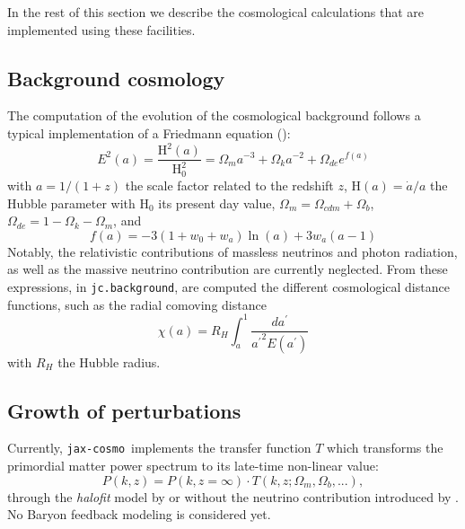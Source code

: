 \documentclass[twocolumn,twocolappendix,nofootinbib,iop]{openjournal}
\newcommand{\jaxcosmo}{\texttt{jax-cosmo}}
\begin{document}
In the rest of this section we describe the cosmological calculations that are implemented using these facilities.

\subsection{Background cosmology}

The computation of the evolution of the cosmological background follows a typical implementation of a Friedmann equation (\citealp[see e.g.][]{2005A&A...443..819P}):
\begin{equation}
    E^2(a) = \frac{\mathrm{H}^2(a)}{\mathrm{H}^2_0} = \Omega_m a^{-3} + \Omega_k a^{-2} + \Omega_{de} e^{f(a)}
\end{equation}
with $a=1/(1+z)$ the scale factor related to the redshift $z$, $\mathrm{H}(a)=\dot{a}/a$ the Hubble parameter with $\mathrm{H}_0$ its present day value, $\Omega_m= \Omega_{cdm}+\Omega_b$, $\Omega_{de}=1-\Omega_k-\Omega_m$, and 
\begin{equation}
    f(a) = -3 (1 + w_0 + w_a) \ln(a) + 3 w_a (a - 1)
\end{equation}
Notably, the relativistic contributions of massless neutrinos and photon radiation, as well as the massive neutrino contribution are currently neglected. From these expressions, in \texttt{jc.background}, are computed the different cosmological distance functions, such as the radial comoving distance
\begin{equation}
     \chi(a) =  R_H \int_a^1 \frac{da^\prime}{{a^\prime}^2 E(a^\prime)}
     \label{eq:radial_comoving}
\end{equation}
with $R_H$ the Hubble radius. 
%
\subsection{Growth of perturbations}
%
Currently, \jaxcosmo\  implements the \citet{Eisenstein_1998} transfer function $T$ which transforms the primordial matter power spectrum to its late-time non-linear value:
\begin{equation}
    P(k, z) = P(k, z=\infty) \cdot T(k, z; \Omega_m, \Omega_b, ...),
\end{equation}
through the \textit{halofit} model by \cite{2012ApJ...761..152T} or \cite{2003MNRAS.341.1311S} without the neutrino contribution introduced by \cite{10.1111/j.1365-2966.2011.20222.x}. No Baryon feedback modeling is considered yet. 
\end{document}
